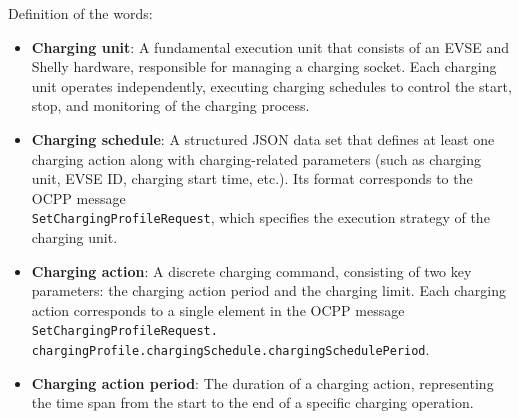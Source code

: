\documentclass[
	english,
	ruledheaders=section,%
	class=report,%
	thesis={type=Report},%
	accentcolor=9c,%
	custommargins=true,%
	marginpar=false,%
	parskip=half-,%
	fontsize=11pt,%
	logofile={img/tuda_logo.pdf}, %
]{tudapub}
\begin{document}
Definition of the words:
\begin{itemize}
    \item \textbf{Charging unit}: A fundamental execution unit that consists of an EVSE and Shelly hardware, responsible for managing a charging socket. Each charging unit operates independently, executing charging schedules to control the start, stop, and monitoring of the charging process.
    
    \item \textbf{Charging schedule}: A structured JSON data set that defines at least one charging action along with charging-related parameters (such as charging unit, EVSE ID, charging start time, etc.). Its format corresponds to the \ac{OCPP} message \\\texttt{SetChargingProfileRequest}, which specifies the execution strategy of the charging unit.
    
    \item \textbf{Charging action}: A discrete charging command, consisting of two key parameters: the charging action period and the charging limit. Each charging action corresponds to a single element in the \ac{OCPP} message \texttt{SetChargingProfileRequest.\\chargingProfile.chargingSchedule.chargingSchedulePeriod}.
    
    \item \textbf{Charging action period}: The duration of a charging action, representing the time span from the start to the end of a specific charging operation.
\end{itemize}
\end{document}
